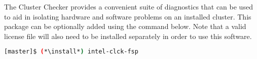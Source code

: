 The \Intel{} Cluster Checker provides a convenient suite of diagnostics that
can be used to aid in isolating hardware and software problems on an installed
cluster. This package can be optionally added using the command below. Note
that a valid license file will also need to be installed separately in order to
use this software.

\begin{lstlisting}[language=bash,keywords={}]
[master]$ (*\install*) intel-clck-fsp
\end{lstlisting}

